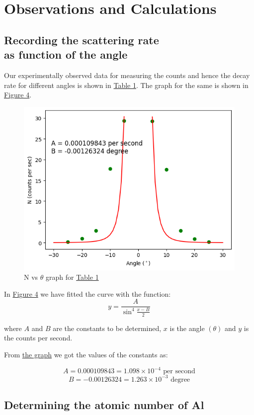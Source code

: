 \section{Observations and Calculations}
	\subsection{Recording the scattering rate\\as function of the angle}

		Our experimentally observed data for measuring the counts and hence the decay rate for different angles is shown in \hyperref[tab:1]{Table 1}. The graph for the same is shown in \hyperref[graph:1]{Figure 4}.

		
		\begin{figure}[h]
			\centering
			\label{graph:1}
			\includegraphics[width=0.8\columnwidth]{images/graph1.png}
			\caption{N vs $\theta$ graph for \hyperref[tab:1]{Table 1}}
		\end{figure}

		In \hyperref[graph:1]{Figure 4} we have fitted the curve with the function:
		$$y = \frac{A}{\sin^4\frac{x-B}{2}}$$

		where $A$ and $B$ are the constants to be determined, $x$ is the angle $(\theta)$ and $y$ is the counts per second.

		From \hyperref[graph:1]{the graph} we got the values of the constants as:

		$$A = 0.000109843 = 1.098\times10^{-4}\text{ per second}$$
		$$B = -0.00126324 = 1.263\times10^{-3}\text{ degree}$$
	
	\subsection{Determining the atomic number of Al}

